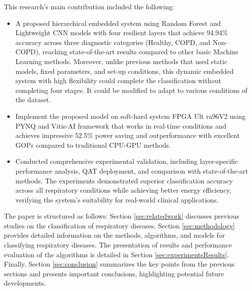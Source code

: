 

This research's main contribution included the following:
\begin{itemize}
    \item A proposed hierarchical embedded system using Random Forest and Lightweight CNN models with four resilient layers that achieve 94.94\% accuracy across three diagnostic categories (Healthy, COPD, and Non-COPD), reaching state-of-the-art results compared to other basic Machine Learning methods. Moreover, unlike previous methods that used static models, fixed parameters, and set-up conditions, this dynamic embedded system with high flexibility could complete the classification without completing four stages. It could be modified to adapt to various conditions of the dataset.
    \item Implement the proposed model on soft-hard system FPGA Ult ra96V2 using PYNQ and Vitis-AI framework that works in real-time conditions and achieves impressive 52.5\% power saving and outperformance with excellent GOPs compared to traditional CPU-GPU methods.
    \item Conducted comprehensive experimental validation, including layer-specific performance analysis, QAT deployment, and comparison with state-of-the-art methods. The experiments demonstrated superior classification accuracy across all respiratory conditions while achieving better energy efficiency, verifying the system's suitability for real-world clinical applications.
\end{itemize}

The paper is structured as follows: Section \ref{sec:relatedwork} discusses previous studies on the classification of respiratory diseases. Section \ref{sec:methodology} provides detailed information on the methods, algorithms, and models for classifying respiratory diseases. The presentation of results and performance evaluation of the algorithms is detailed in Section \ref{sec:experimentsResults}. Finally, Section \ref{sec:conclusion} summarizes the key points from the previous sections and presents important conclusions, highlighting potential future developments.
